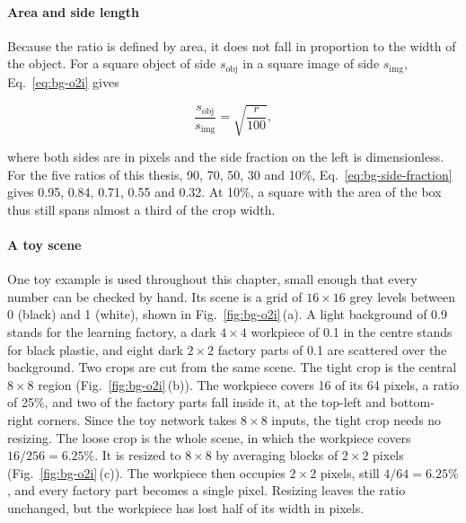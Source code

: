 \paragraph{Area and side length}
Because the ratio is defined by area, it does not fall in proportion to the width of the
object. For a square object of side $s_{\mathrm{obj}}$ in a square image of side
$s_{\mathrm{img}}$, Eq.~\eqref{eq:bg-o2i} gives

\begin{equation}
\frac{s_{\mathrm{obj}}}{s_{\mathrm{img}}} = \sqrt{\frac{r}{100}},
\label{eq:bg-side-fraction}
\end{equation}

where both sides are in pixels and the side fraction on the left is dimensionless. For
the five ratios of this thesis, 90, 70, 50, 30 and 10\%,
Eq.~\eqref{eq:bg-side-fraction} gives 0.95, 0.84, 0.71, 0.55 and 0.32. At 10\%, a square
with the area of the box thus still spans almost a third of the crop width.

\paragraph{A toy scene}
One toy example is used throughout this chapter, small enough that every number can be
checked by hand. Its scene is a grid of $16 \times 16$ grey levels between 0 (black) and
1 (white), shown in Fig.~\ref{fig:bg-o2i}\,(a). A light background of 0.9 stands for the
learning factory, a dark $4 \times 4$ workpiece of 0.1 in the centre stands for black
plastic, and eight dark $2 \times 2$ factory parts of 0.1 are scattered over the
background. Two crops are cut from the same scene. The tight crop is the central
$8 \times 8$ region (Fig.~\ref{fig:bg-o2i}\,(b)). The workpiece covers 16 of its 64
pixels, a ratio of 25\%, and two of the factory parts fall inside it, at the top-left and
bottom-right corners. Since the toy network takes $8 \times 8$ inputs, the tight crop
needs no resizing. The loose crop is the whole scene, in which the workpiece covers
$16/256 = 6.25\%$. It is resized to $8 \times 8$ by averaging blocks of $2 \times 2$
pixels (Fig.~\ref{fig:bg-o2i}\,(c)). The workpiece then occupies $2 \times 2$ pixels,
still $4/64 = 6.25\%$, and every factory part becomes a single pixel. Resizing leaves the
ratio unchanged, but the workpiece has lost half of its width in pixels.


